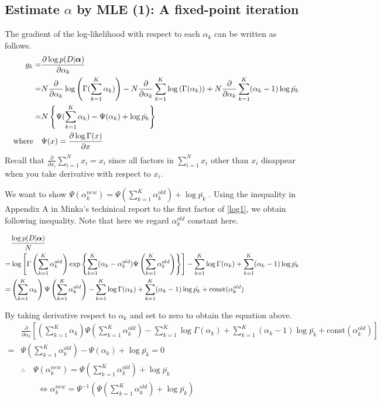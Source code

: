 \documentclass[10.5pt,letterpaper]{article}
\theoremstyle{plain}
\begin{document}
\subsection{Estimate $\alpha$ by MLE (1): A fixed-point iteration}

The gradient of the log-likelihood with respect to each $\alpha_k$ can be written as follows.
\begin{align}
	g_k =& \frac{\partial \log p(D | \boldsymbol{\alpha}) }{\partial \alpha_k} \\
	= & N  \frac{\partial}{\partial \alpha_k} \log \left( \Gamma(\sum_{k=1}^K \alpha_k) \right) 
- N \frac{\partial}{\partial \alpha_k} \sum_{k=1}^K  \log \left( \Gamma(\alpha_k) \right) 
+ N \frac{\partial}{\partial \alpha_k} \sum_{k=1}^K  (\alpha_k - 1) \log \bar{p_{k}}  \\
	= & N \left\{ \Psi( \sum_{k=1}^K \alpha_k ) - \Psi(\alpha_k) + \log \bar{p_k} \right\}\\
	\quad \textrm{where} \quad & \Psi(x) = \frac{\partial \log \Gamma(x) }{\partial x}
\end{align}
Recall that $ \frac{\partial}{ \partial x_i}  \sum_{i=1}^N x_i  = x_i$ since all factors in $\sum_{i=1}^N x_i$ other than $x_i$ disappear when you take derivative with respect to $x_i$.

We want to show $\Psi(\alpha_k^{new}) = \Psi(\sum_{k=1}^K \alpha_k^{old} ) + \log \bar{p_k} $ .
Using the inequality in Appendix A in Minka's techinical report to the first factor of \eqref{log1}, we obtain following inequality.
Note that here we regard $\alpha_k^{old}$ constant here.

\begin{align}
	&\frac{\log p(D | \boldsymbol{\alpha}) }{N} \\
	= & \log \left[ \Gamma \left( \sum_{k=1}^K \alpha_k^{old}  \right)
\exp \left\{ \sum_{k=1}^K (\alpha_k - \alpha_k^{old} ) \Psi \left( \sum_{k=1}^K \alpha_k^{old} \right) \right\} \right]
- \sum_{k=1}^K \log \Gamma(\alpha_k) + \sum_{k=1}^K (\alpha_k -1 ) \log \bar{p_k}  \\
	=& \left(\sum_{k=1}^K \alpha_k \right) \Psi \left( \sum_{k=1}^K \alpha_k^{old} \right) - \sum_{k=1}^K \log \Gamma(\alpha_k) + \sum_{k=1}^K (\alpha_k -1 ) \log \bar{p_k}  + \textrm{const} (\alpha_k^{old})
\end{align}

By taking derivative respect to $\alpha_k$ and set to zero to obtain the equation above.
\begin{align}
& \frac{\partial}{\partial \alpha_k} \left[ \left(\sum_{k=1}^K \alpha_k \right) \Psi \left( \sum_{k=1}^K \alpha_k^{old} \right) - \sum_{k=1}^K \log \Gamma(\alpha_k) + \sum_{k=1}^K (\alpha_k -1 ) \log \bar{p_k}  + \textrm{const} (\alpha_k^{old}) \right] \\
= & \Psi \left( \sum_{k=1}^K \alpha_k^{old} \right) - \Psi(\alpha_k) + \log\bar{p_k} = 0\\
& \therefore \quad \Psi(\alpha_k^{new}) = \Psi(\sum_{k=1}^K \alpha_k^{old} ) + \log\bar{p_k}  \\
& \qquad \Leftrightarrow  \alpha_k^{new} = \Psi^{-1} \left( \Psi(\sum_{k=1}^K \alpha_k^{old} ) + \log\bar{p_k}  \right)
\end{align}
\end{document}
